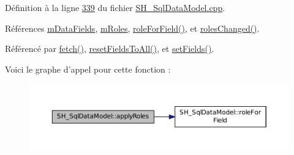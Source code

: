 Définition à la ligne \hyperlink{SH__SqlDataModel_8cpp_source_l00339}{339} du fichier \hyperlink{SH__SqlDataModel_8cpp_source}{S\-H\-\_\-\-Sql\-Data\-Model.\-cpp}.



Références \hyperlink{classSH__SqlDataModel_a3e998f75dd5b3193783612002461888d}{m\-Data\-Fields}, \hyperlink{classSH__SqlDataModel_ad1e46c72a6aeb83e3e7bb0c3110d12a4}{m\-Roles}, \hyperlink{classSH__SqlDataModel_aa487bb763eaf2544e4eb5822cd666105}{role\-For\-Field()}, et \hyperlink{classSH__SqlDataModel_acf85dacdcc946ef27377d221b16b0e41}{roles\-Changed()}.



Référencé par \hyperlink{classSH__SqlDataModel_ab6c206088250a66ddc8cb8d33a38e421}{fetch()}, \hyperlink{classSH__SqlDataModel_ad0477d16e78ba808250e2054952f9833}{reset\-Fields\-To\-All()}, et \hyperlink{classSH__SqlDataModel_ad297d359375d55e66493ce8935f8ff05}{set\-Fields()}.




Voici le graphe d'appel pour cette fonction \-:\nopagebreak
\begin{figure}[H]
\begin{center}
\leavevmode
\includegraphics[width=350pt]{classSH__SqlDataModel_ad4f032ceb7c2f70b2d7388e3afd161ab_cgraph}
\end{center}
\end{figure}




